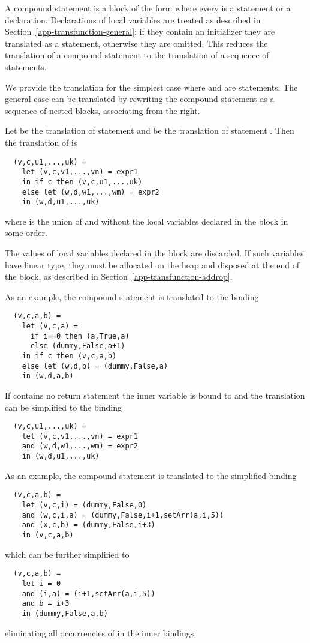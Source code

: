 A compound statement is a block of the form  where every  is a statement or a declaration.
Declarations of local variables are treated as described in Section~\ref{app-transfunction-general}: if they contain an
initializer they are translated as a statement, otherwise they are omitted. This reduces the translation of a compound
statement to the translation of a sequence of statements.

We provide the translation for the simplest case  where  and  are statements.
The general case can be translated by rewriting the compound statement as a sequence of nested blocks, associating
from the right.

Let  be the translation of statement  and  
be the translation of statement . Then the translation of
 is
\begin{verbatim}
  (v,c,u1,...,uk) =
    let (v,c,v1,...,vn) = expr1
    in if c then (v,c,u1,...,uk)
    else let (w,d,w1,...,wm) = expr2
    in (w,d,u1,...,uk)
\end{verbatim}
where  is the union of  and  without the local variables 
declared in the block in some order.

The values of local variables declared in the block are discarded. If such variables have linear type, they must
be allocated on the heap and disposed at the end of the block, as described in Section~\ref{app-transfunction-addrop}.

As an example, the compound statement  is translated to the binding
\begin{verbatim}
  (v,c,a,b) =
    let (v,c,a) = 
      if i==0 then (a,True,a) 
      else (dummy,False,a+1)
    in if c then (v,c,a,b)
    else let (w,d,b) = (dummy,False,a)
    in (w,d,a,b)
\end{verbatim}

If  contains no return statement the inner variable  is bound to  and the translation
can be simplified to the binding
\begin{verbatim}
  (v,c,u1,...,uk) =
    let (v,c,v1,...,vn) = expr1
    and (w,d,w1,...,wm) = expr2
    in (w,d,u1,...,uk)
\end{verbatim}

As an example, the compound statement  is translated to the 
simplified binding
\begin{verbatim}
  (v,c,a,b) =
    let (v,c,i) = (dummy,False,0)
    and (w,c,i,a) = (dummy,False,i+1,setArr(a,i,5))
    and (x,c,b) = (dummy,False,i+3)
    in (v,c,a,b)
\end{verbatim}
which can be further simplified to
\begin{verbatim}
  (v,c,a,b) =
    let i = 0
    and (i,a) = (i+1,setArr(a,i,5))
    and b = i+3
    in (dummy,False,a,b)
\end{verbatim}
eliminating all occurrencies of  in the inner bindings.

